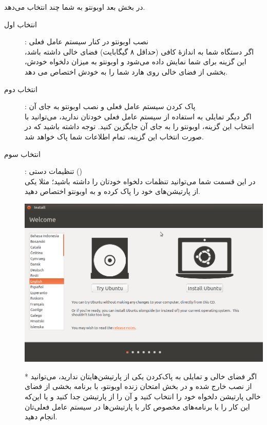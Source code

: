در بخش بعد اوبونتو به شما چند انتخاب می‌دهد.
\begin{description}
\item[انتخاب اول]: نصب اوبونتو در کنار سیستم عامل فعلی\\
اگر دستگاه شما به اندازهٔ کافی (حداقل ۸ گیگابایت) فضای خالی داشته باشد، این گزینه برای شما نمایش داده می‌شود و اوبونتو به میزان دلخواه خودش، بخشی از فضای خالی روی هارد شما را به خودش اختصاص می دهد.

\item[انتخاب دوم]: پاک کردن سیستم عامل فعلی و نصب اوبونتو به جای آن\\
اگر دیگر تمایلی به استفاده از سیستم عامل فعلی خودتان ندارید، می‌توانید با انتخاب این گزینه، اوبونتو را به جای آن جایگزین کنید. توجه داشته باشید که در صورت انتخاب این گزینه، تمام اطلاعات شما پاک خواهد شد.

\item[انتخاب سوم]: تنظیمات دستی ()\\
در این قسمت شما می‌توانید تنظمات دلخواه خودتان را داشته باشید؛ مثلا یکی از پارتیشن‌های خود را پاک کرده و به اوبونتو اختصاص دهید.\\
\begin{center}
\includegraphics[scale=0.45]{pics/3.png}\\
\end{center}
* اگر فضای خالی و تمایلی به پاک‌کردن یکی  از پارتیشن‌هایتان ندارید، می‌توانید از نصب خارج شده و در بخش امتحان زنده اوبونتو، با برنامه  بخشی از فضای خالی پارتیشن  دلخواه خود را انتخاب کنید و آن را از پارتیشن جدا کنید و یا این‌که این کار را با برنامه‌های مخصوص کار با پارتیشن‌ها در سیستم عامل فعلی‌تان انجام دهید.
\end{description}

